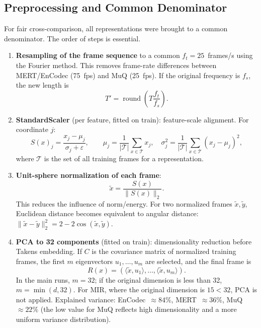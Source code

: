 \subsection{Preprocessing and Common Denominator}\label{ssec:preprocess}

For fair cross-comparison, all representations were brought to a common denominator. The order of steps is essential.

\begin{enumerate}
    \item \textbf{Resampling of the frame sequence} to a common $f_t = 25$~frames/s using the Fourier method. This removes frame-rate differences between MERT/EnCodec (75~fps) and MuQ (25~fps). If the original frequency is $f_s$, the new length is
    \begin{equation}\label{eq:resample}
    T'=\operatorname{round}\!\left(T\frac{f_t}{f_s}\right).
    \end{equation}

    \item \textbf{StandardScaler} (per feature, fitted on train): feature-scale alignment. For coordinate $j$:
    \begin{equation}\label{eq:scaler}
    S(x)_j=\frac{x_j-\mu_j}{\sigma_j+\varepsilon}, \qquad
    \mu_j=\frac{1}{|\mathcal{T}|}\sum_{x\in\mathcal{T}}x_j, \quad
    \sigma_j^2=\frac{1}{|\mathcal{T}|}\sum_{x\in\mathcal{T}}(x_j-\mu_j)^2,
    \end{equation}
    where $\mathcal{T}$ is the set of all training frames for a representation.

    \item \textbf{Unit-sphere normalization of each frame}:
    \begin{equation}\label{eq:normalize}
    \tilde{x}=\frac{S(x)}{\|S(x)\|_2}.
    \end{equation}
    This reduces the influence of norm/energy. For two normalized frames $\tilde{x},\tilde{y}$, Euclidean distance becomes equivalent to angular distance: $\|\tilde{x}-\tilde{y}\|_2^2 = 2 - 2\cos(\tilde{x},\tilde{y})$.

    \item \textbf{PCA to 32 components} (fitted on train): dimensionality reduction before Takens embedding. If $C$ is the covariance matrix of normalized training frames, the first $m$ eigenvectors $u_1,\ldots,u_m$ are selected, and the final frame is
    \begin{equation}\label{eq:pca}
    R(x)=\left(\langle \tilde{x},u_1\rangle,\ldots,\langle \tilde{x},u_m\rangle\right).
    \end{equation}
    In the main runs, $m=32$; if the original dimension is less than 32, $m=\min(d,32)$. For MIR, where the original dimension is $15 < 32$, PCA is not applied. Explained variance: EnCodec~$\approx 84\%$, MERT~$\approx 36\%$, MuQ~$\approx 22\%$ (the low value for MuQ reflects high dimensionality and a more uniform variance distribution).
\end{enumerate}

